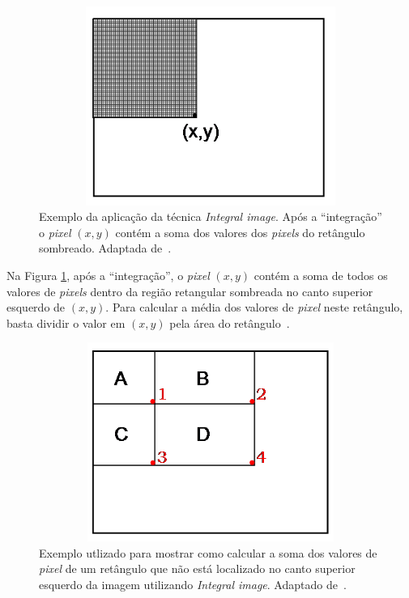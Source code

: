 	\begin{figure}[hbt]
		\begin{center}
			\includegraphics[height=6.5cm,width=12.5cm]{figuras/2.FundamentacaoTeorica/integral_image.png}
		\end{center}
		\caption{Exemplo da aplicação da técnica \textit{Integral image}. Após a ``integração'' o \textit{pixel} $\displaystyle (x,y)$ contém a soma dos valores dos \textit{pixels} do retângulo sombreado. Adaptada de~\cite{servodetection}.}
		\label{integralimage}
	\end{figure}

Na Figura \ref{integralimage}, após a ``integração'', o \textit{pixel} $\displaystyle (x,y)$ contém a soma de todos os valores de \textit{pixels} dentro da região retangular sombreada no canto superior esquerdo de $\displaystyle (x,y)$. Para calcular a média dos valores de \textit{pixel} neste retângulo, basta dividir o valor em $\displaystyle (x,y)$ pela área do retângulo~\cite{servodetection}.

	\begin{figure}[hbt]
		\begin{center}
			\includegraphics[height=6.5cm,width=12.5cm]{figuras/2.FundamentacaoTeorica/integral_image2.png}
		\end{center}
		\caption{Exemplo utlizado para mostrar como calcular a soma dos valores de \textit{pixel} de um retângulo que não está localizado no canto superior esquerdo da imagem utilizando \textit{Integral image}. Adaptado de~\cite{servodetection}.}
		\label{integralimage2}
	\end{figure}

